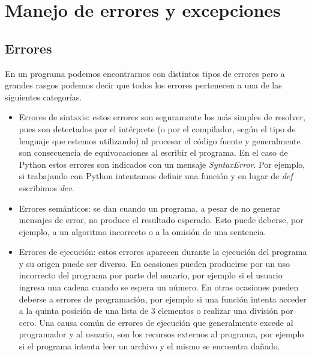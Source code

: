 
%

\chapter{Manejo de errores y excepciones}

\section{Errores}

En un programa podemos encontrarnos con distintos tipos de errores pero a
grandes rasgos podemos decir que todos los errores pertenecen a una de las
siguientes categorías.

\begin{itemize}

\item Errores de sintaxis: estos errores son seguramente los más simples de
resolver, pues son detectados por el intérprete (o por el compilador, según el
tipo de lenguaje que estemos utilizando) al procesar el código fuente y
generalmente son consecuencia de equivocaciones al escribir el programa. En el
caso de Python estos errores son indicados con un mensaje {\it SyntaxError}.
Por ejemplo, si trabajando con Python intentamos definir una función y en
lugar de {\it def} escribimos {\it dev}.

\item Errores semánticos: se dan cuando un programa, a pesar de no generar
mensajes de error, no produce el resultado esperado. Esto puede deberse, por
ejemplo, a un algoritmo incorrecto o a la omisión de una sentencia.

\item Errores de ejecución: estos errores aparecen durante la ejecución del
programa y su origen puede ser diverso. En ocasiones pueden producirse por un
uso incorrecto del programa por parte del usuario, por ejemplo si el usuario
ingresa una cadena cuando se espera un número. En otras ocasiones pueden
deberse a errores de programación, por ejemplo si una función intenta acceder
a la quinta posición de una lista de 3 elementos o realizar una división por
cero. Una causa común de errores de ejecución que generalmente excede al
programador y al usuario, son los recursos externos al programa, por ejemplo
si el programa intenta leer un archivo y el mismo se encuentra dañado.

\end{itemize}

